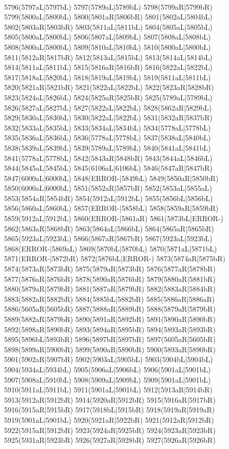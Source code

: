 \\5796(5797aL|5797bL) 5797(5789aL|5789bL) 5798(5799aR|5799bR) 5799(5800aL|5800bL) 5800(5801aR|5806bR) 5801(5802aL|5804bL) 5802(5803aR|5803bR) 5803(5811aL|5811bL) 5804(5805aL|5805bL) \\5805(5800aL|5800bL) 5806(5807aL|5809bL) 5807(5808aL|5808bL) 5808(5800aL|5800bL) 5809(5810aL|5810bL) 5810(5800aL|5800bL) 5811(5812aR|5817bR) 5812(5813aL|5815bL) 5813(5814aL|5814bL) \\5814(5811aL|5811bL) 5815(5816aR|5816bR) 5816(5822aL|5822bL) 5817(5818aL|5820bL) 5818(5819aL|5819bL) 5819(5811aL|5811bL) 5820(5821aR|5821bR) 5821(5822aL|5822bL) 5822(5823aR|5828bR) \\5823(5824aL|5826bL) 5824(5825aR|5825bR) 5825(5789aL|5789bL) 5826(5827aL|5827bL) 5827(5822aL|5822bL) 5828(5862aR|5829bL) 5829(5830aL|5830bL) 5830(5822aL|5822bL) 5831(5832aR|5837bR) \\5832(5833aL|5835bL) 5833(5834aL|5834bL) 5834(5778aL|5778bL) 5835(5836aL|5836bL) 5836(5778aL|5778bL) 5837(5838aL|5840bL) 5838(5839aL|5839bL) 5839(5789aL|5789bL) 5840(5841aL|5841bL) \\5841(5778aL|5778bL) 5842(5843aR|5848bR) 5843(5844aL|5846bL) 5844(5845aL|5845bL) 5845(6106aL|6106bL) 5846(5847aR|5847bR) 5847(6000aL|6000bL) 5848(ERROR-|5849bL) 5849(5850aR|5850bR) \\5850(6000aL|6000bL) 5851(5852aR|5857bR) 5852(5853aL|5855aL) 5853(5854aR|5854bR) 5854(5912aL|5912bL) 5855(5856bL|5856bL) 5856(5860aL|5860bL) 5857(ERROR-|5858bL) 5858(5859aR|5859bR) \\5859(5912aL|5912bL) 5860(ERROR-|5861aR) 5861(5873bL|ERROR-) 5862(5863aR|5868bR) 5863(5864aL|5866bL) 5864(5865aR|5865bR) 5865(5923aL|5923bL) 5866(5867aR|5867bR) 5867(5923aL|5923bL) \\5868(ERROR-|5869aL) 5869(5870bL|5870bL) 5870(5871aL|5871bL) 5871(ERROR-|5872bR) 5872(5876bL|ERROR-) 5873(5874aR|5875bR) 5874(5873aR|5873bR) 5875(5879aR|5873bR) 5876(5877aR|5878bR) \\5877(5876aR|5876bR) 5878(5890aR|5876bR) 5879(5880aR|5881bR) 5880(5879aR|5879bR) 5881(5887aR|5879bR) 5882(5883aR|5884bR) 5883(5882aR|5882bR) 5884(5885bL|5882bR) 5885(5886aR|5886aR) \\5886(5605aR|5605bR) 5887(5888aR|5889bR) 5888(5879aR|5879bR) 5889(5882aR|5879bR) 5890(5891aR|5892bR) 5891(5890aR|5890bR) 5892(5898aR|5890bR) 5893(5894aR|5895bR) 5894(5893aR|5893bR) \\5895(5896bL|5893bR) 5896(5897bR|5897bR) 5897(5605aR|5605bR) 5898(5899aR|5900bR) 5899(5890aR|5890bR) 5900(5893aR|5890bR) 5901(5902aR|5907bR) 5902(5903aL|5905bL) 5903(5904bL|5904bL) \\5904(5934aL|5934bL) 5905(5906aL|5906bL) 5906(5901aL|5901bL) 5907(5908aL|5910bL) 5908(5909aL|5909bL) 5909(5901aL|5901bL) 5910(5911aL|5911bL) 5911(5901aL|5901bL) 5912(5913aR|5914bR) \\5913(5912aR|5912bR) 5914(5920aR|5912bR) 5915(5916aR|5917bR) 5916(5915aR|5915bR) 5917(5918bL|5915bR) 5918(5919aR|5919aR) 5919(5901aL|5901bL) 5920(5921aR|5922bR) 5921(5912aR|5912bR) \\5922(5915aR|5912bR) 5923(5924aR|5925bR) 5924(5923aR|5923bR) 5925(5931aR|5923bR) 5926(5927aR|5928bR) 5927(5926aR|5926bR) 